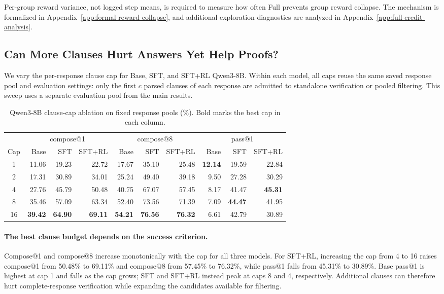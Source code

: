 Per-group reward variance, not logged step means, is required
to measure how often Full prevents group reward collapse. The mechanism is formalized in
Appendix~\ref{app:formal-reward-collapse}, and additional exploration diagnostics
are analyzed in Appendix~\ref{app:full-credit-analysis}.

\finishfigurewrap

\subsection{Can More Clauses Hurt Answers Yet Help Proofs?}
\label{app:clause-cap}

We vary the per-response clause cap for Base, SFT, and SFT+RL Qwen3-8B.
Within each model, all caps reuse the same saved response pool and evaluation
settings: only the first \(c\) parsed clauses of each response are admitted
to standalone verification or pooled filtering. This sweep uses a separate
evaluation pool from the main results.

\begin{table}[H]
\centering
\small
\setlength{\tabcolsep}{3pt}
\caption{Qwen3-8B clause-cap ablation on fixed response pools (\%). Bold marks the best cap in each column.}
\label{tab:clause-cap-ablation}
\begin{tabular}{crrrrrrrrr}
\toprule
\rowcolor{algobg}
& \multicolumn{3}{c}{compose@1} & \multicolumn{3}{c}{compose@8}
& \multicolumn{3}{c}{pass@1} \\
\headercmidrules{\cmidrule(lr){2-4}\cmidrule(lr){5-7}\cmidrule(lr){8-10}}
\rowcolor{algobg}
Cap & Base & SFT & SFT+RL & Base & SFT & SFT+RL & Base & SFT & SFT+RL \\
\midrule
1 & 11.06 & 19.23 & 22.72 & 17.67 & 35.10 & 25.48 & \textbf{12.14} & 19.59 & 22.84 \\
2 & 17.31 & 30.89 & 34.01 & 25.24 & 49.40 & 39.18 & 9.50 & 27.28 & 30.29 \\
4 & 27.76 & 45.79 & 50.48 & 40.75 & 67.07 & 57.45 & 8.17 & 41.47 & \textbf{45.31} \\
8 & 35.46 & 57.09 & 63.34 & 52.40 & 73.56 & 71.39 & 7.09 & \textbf{44.47} & 41.95 \\
16 & \textbf{39.42} & \textbf{64.90} & \textbf{69.11} & \textbf{54.21} & \textbf{76.56} & \textbf{76.32} & 6.61 & 42.79 & 30.89 \\
\bottomrule
\end{tabular}
\end{table}

\paragraph{The best clause budget depends on the success criterion.}
Compose@1 and compose@8 increase monotonically with the cap for all three
models.  For SFT+RL, increasing the cap from 4 to 16 raises compose@1 from
50.48\% to 69.11\% and compose@8 from 57.45\% to 76.32\%, while pass@1 falls
from 45.31\% to 30.89\%.  Base pass@1 is highest at cap 1 and falls as the
cap grows; SFT and SFT+RL instead peak at caps 8 and 4, respectively.
Additional clauses can therefore hurt complete-response verification while
expanding the candidates available for filtering.

